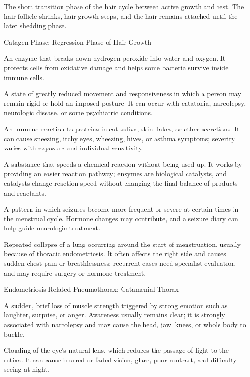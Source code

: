  The short transition phase of the hair cycle between active growth and rest. The hair follicle shrinks, hair growth stops, and the hair remains attached until the later shedding phase.

\synonyms
Catagen Phase; Regression Phase of Hair Growth

 An enzyme that breaks down hydrogen peroxide into water and oxygen. It protects cells from oxidative damage and helps some bacteria survive inside immune cells.

 A state of greatly reduced movement and responsiveness in which a person may remain rigid or hold an imposed posture. It can occur with catatonia, narcolepsy, neurologic disease, or some psychiatric conditions.

 An immune reaction to proteins in cat saliva, skin flakes, or other secretions. It can cause sneezing, itchy eyes, wheezing, hives, or asthma symptoms; severity varies with exposure and individual sensitivity.

 A substance that speeds a chemical reaction without being used up. It works by providing an easier reaction pathway; enzymes are biological catalysts, and catalysts change reaction speed without changing the final balance of products and reactants.

 A pattern in which seizures become more frequent or severe at certain times in the menstrual cycle. Hormone changes may contribute, and a seizure diary can help guide neurologic treatment.

 Repeated collapse of a lung occurring around the start of menstruation, usually because of thoracic endometriosis. It often affects the right side and causes sudden chest pain or breathlessness; recurrent cases need specialist evaluation and may require surgery or hormone treatment.

\synonyms
Endometriosis-Related Pneumothorax; Catamenial Thorax

 A sudden, brief loss of muscle strength triggered by strong emotion such as laughter, surprise, or anger. Awareness usually remains clear; it is strongly associated with narcolepsy and may cause the head, jaw, knees, or whole body to buckle.

 Clouding of the eye's natural lens, which reduces the passage of light to the retina. It can cause blurred or faded vision, glare, poor contrast, and difficulty seeing at night.

